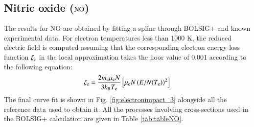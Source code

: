 %
\subsection{Nitric oxide ($\rm NO$)}

The results for NO are obtained by fitting a spline through BOLSIG+ and known experimental data. For electron temperatures less than 1000 K, the reduced electric field is computed assuming that the corresponding electron energy loss function $\zeta_{\rm e} $ in the local approximation takes the floor value of 0.001 according to the following equation:
%
\begin{equation}
\zeta_{\rm e}   =    \frac{2 m_{\rm e} \mu_{\rm e} N}{3  k_{\rm B} T_{\rm e} } \left[  \mu_{\rm e}N  \left(E/N(T_{\rm e})\right)^2\right]
\end{equation}
%
The final curve fit is shown in Fig. \ref{fig:electronimpact_3} alongside all the reference data used to obtain it. All the processes involving cross-sections used in the BOLSIG+ calculation are given in Table \ref{tab:tableNO}.


